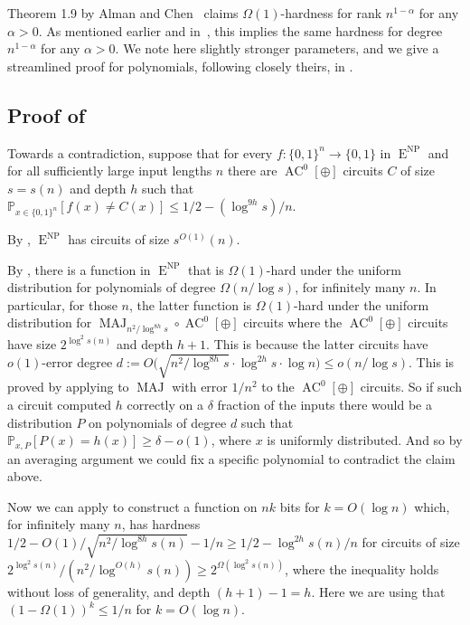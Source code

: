 \documentclass{toc}
\DeclareMathOperator{\MAJ}{\mathrm{MAJ}}  %
\DeclareMathOperator{\AC}{\mathrm{AC}}  %
\DeclareMathOperator{\NP}{\mathrm{NP}}  %
\DeclareMathOperator{\EEE}{\mathrm{E}}  %
\newcommand{\zo}{\{0, 1\}}
\renewcommand{\P}{\mathbb{P}}
\begin{document}
Theorem 1.9 by Alman and Chen~\cite{AlmanC19} claims $\Omega(1)$-hardness
for rank $n^{1-\alpha}$ for any $\alpha>0$. As mentioned earlier
and in~\cite{ServedioV-sparse}, this implies the same hardness for
degree \emph{$n^{1-\alpha}$} for any $\alpha>0$. We note here slightly
stronger parameters, and we give a streamlined proof for polynomials,
following closely theirs, in .

\subsection{Proof of }

Towards a contradiction, suppose that for every $f:\zo^{n}\to\zo$
in $\EEE^{\NP}$ and for all sufficiently large input lengths $n$ there
are $\AC^{0}[\oplus]$ circuits $C$ of size $s=s(n)$ and depth $h$
such that $\P_{x\in\zo^{n}}[f(x)\ne C(x)]\le1/2-(\log^{9h}s)/n$.

By , $\EEE^{\NP}$ has circuits of size $s^{O(1)}(n)$.

By , there is a function
in $\EEE^{\NP}$ that is $\Omega(1)$-hard under the uniform distribution
for polynomials of degree $\Omega(n/\log s)$, for infinitely many
$n$. In particular, for those $n$, the latter function is $\Omega(1)$-hard
under the uniform distribution for $\MAJ_{n^{2}/\log^{8h}s}\circ \AC^{0}[\oplus]$
circuits where the $\AC^{0}[\oplus]$ circuits have size $2^{\log^{2}s(n)}$
and depth $h+1$. This is because the latter circuits have $o(1)$-error
degree $d:=O(\sqrt{n^{2}/\log^{8h}s}\cdot\ensuremath{\log^{2h}s\cdot\log n)\le o(n/\log s)}$.
This is proved by applying  to $\MAJ$ 
with error $1/n^{2}$ to the $\AC^{0}[\oplus]$ circuits. So if such
a circuit computed $h$ correctly on a $\delta$ fraction of the inputs
there would be a distribution $P$ on polynomials of degree $d$ such
that $\P_{x,P}[P(x)=h(x)]\ge\delta-o(1)$, where $x$ is uniformly
distributed. And so by an averaging argument we could fix a specific
polynomial to contradict the claim above.

Now we can apply  to construct a function
on $nk$ bits for $k=O(\log n)$ which, for infinitely many $n$,
has hardness %
$1/2-O(1)\Big/\sqrt{n^{2}/\log^{8h}s(n)}-1/n\ge1/2-\log^{2h}s(n)/n$ %
for circuits of size $2^{\log^{2}s(n)}/(n^{2}/\log^{O(h)}s(n))\ge2^{\Omega(\log^{2}s(n))}$,
where the inequality holds without loss of generality, and depth $(h+1)-1=h$.
Here we are using that $(1-\Omega(1))^{k}\le1/n$ for $k=O(\log n)$.
\end{document}
